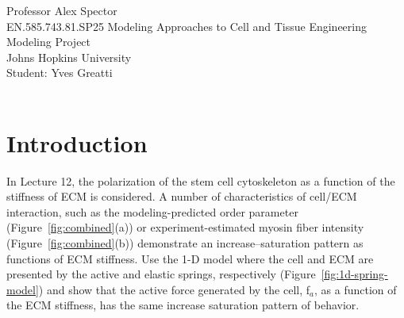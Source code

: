 \documentclass{article}
\begin{document}
\noindent Professor Alex Spector\\
EN.585.743.81.SP25 Modeling Approaches to Cell and Tissue Engineering\\
Modeling Project\\
Johns Hopkins University\\
Student: Yves Greatti\\\

\section*{Introduction}
In Lecture 12, the polarization of the stem cell cytoskeleton as a function of
the stiffness of ECM is considered. A number of characteristics of cell/ECM
interaction, such as the modeling-predicted order parameter \cite{Zemel2010}
(Figure~\ref{fig:combined}(a)) or experiment-estimated myosin fiber intensity
\cite{Zemel2010} (Figure~\ref{fig:combined}(b)) demonstrate an
increase–saturation pattern as functions of ECM stiffness.
Use the 1-D model where the cell and ECM are presented by the active and
elastic springs, respectively \cite{Zemel2010}  (Figure~\ref{fig:1d-spring-model}) and show that the active force generated
by the cell, f$_a$, as a function of the ECM stiffness, has the same increase 
saturation pattern of behavior.
\end{document}
